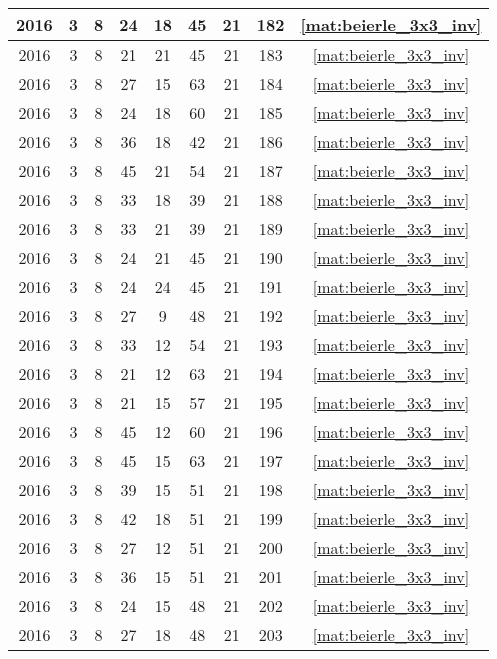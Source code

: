 \begin{longtable}{|c|c|c|c|c|c|c|c|c|}
2016 & 3 & 8 & 24 & 18 & 45 & 21 & 182 & \eqref{mat:beierle_3x3_inv} \\ \hline 
2016 & 3 & 8 & 21 & 21 & 45 & 21 & 183 & \eqref{mat:beierle_3x3_inv} \\ \hline 
2016 & 3 & 8 & 27 & 15 & 63 & 21 & 184 & \eqref{mat:beierle_3x3_inv} \\ \hline 
2016 & 3 & 8 & 24 & 18 & 60 & 21 & 185 & \eqref{mat:beierle_3x3_inv} \\ \hline 
2016 & 3 & 8 & 36 & 18 & 42 & 21 & 186 & \eqref{mat:beierle_3x3_inv} \\ \hline 
2016 & 3 & 8 & 45 & 21 & 54 & 21 & 187 & \eqref{mat:beierle_3x3_inv} \\ \hline 
2016 & 3 & 8 & 33 & 18 & 39 & 21 & 188 & \eqref{mat:beierle_3x3_inv} \\ \hline 
2016 & 3 & 8 & 33 & 21 & 39 & 21 & 189 & \eqref{mat:beierle_3x3_inv} \\ \hline 
2016 & 3 & 8 & 24 & 21 & 45 & 21 & 190 & \eqref{mat:beierle_3x3_inv} \\ \hline 
2016 & 3 & 8 & 24 & 24 & 45 & 21 & 191 & \eqref{mat:beierle_3x3_inv} \\ \hline 
2016 & 3 & 8 & 27 & 9 & 48 & 21 & 192 & \eqref{mat:beierle_3x3_inv} \\ \hline 
2016 & 3 & 8 & 33 & 12 & 54 & 21 & 193 & \eqref{mat:beierle_3x3_inv} \\ \hline 
2016 & 3 & 8 & 21 & 12 & 63 & 21 & 194 & \eqref{mat:beierle_3x3_inv} \\ \hline 
2016 & 3 & 8 & 21 & 15 & 57 & 21 & 195 & \eqref{mat:beierle_3x3_inv} \\ \hline 
2016 & 3 & 8 & 45 & 12 & 60 & 21 & 196 & \eqref{mat:beierle_3x3_inv} \\ \hline 
2016 & 3 & 8 & 45 & 15 & 63 & 21 & 197 & \eqref{mat:beierle_3x3_inv} \\ \hline 
2016 & 3 & 8 & 39 & 15 & 51 & 21 & 198 & \eqref{mat:beierle_3x3_inv} \\ \hline 
2016 & 3 & 8 & 42 & 18 & 51 & 21 & 199 & \eqref{mat:beierle_3x3_inv} \\ \hline 
2016 & 3 & 8 & 27 & 12 & 51 & 21 & 200 & \eqref{mat:beierle_3x3_inv} \\ \hline 
2016 & 3 & 8 & 36 & 15 & 51 & 21 & 201 & \eqref{mat:beierle_3x3_inv} \\ \hline 
2016 & 3 & 8 & 24 & 15 & 48 & 21 & 202 & \eqref{mat:beierle_3x3_inv} \\ \hline 
2016 & 3 & 8 & 27 & 18 & 48 & 21 & 203 & \eqref{mat:beierle_3x3_inv} \\ \hline 

\end{longtable}
